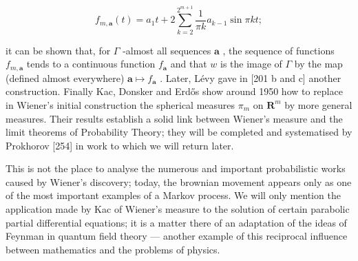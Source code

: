 \[
f _ {m, \mathbf {a}} (t) = a _ {1} t + 2 \sum_ {k = 2} ^ {2 ^ {m + 1}} \frac {1}{\pi k} a _ {k - 1} \sin \pi k t;
\]

it can be shown that, for \(\Gamma\) -almost all sequences \(\mathbf{a}\) , the sequence of functions \(f_{m,\mathbf{a}}\) tends to a continuous function \(f_{\mathbf{a}}\) and that \(w\) is the image of \(\Gamma\) by the map (defined almost everywhere) \(\mathbf{a} \mapsto f_{\mathbf{a}}\) . Later, Lévy gave in {[}201 b and c{]} another construction. Finally Kac, Donsker and Erdős show around 1950 how to replace in Wiener's initial construction the spherical measures \(\pi_m\) on \(\mathbf{R}^m\) by more general measures. Their results establish a solid link between Wiener's measure and the limit theorems of Probability Theory; they will be completed and systematised by Prokhorov {[}254{]} in work to which we will return later.

This is not the place to analyse the numerous and important probabilistic works caused by Wiener's discovery; today, the brownian movement appears only as one of the most important examples of a Markov process. We will only mention the application made by Kac of Wiener's measure to the solution of certain parabolic partial differential equations; it is a matter there of an adaptation of the ideas of Feynman in quantum field theory --- another example of this reciprocal influence between mathematics and the problems of physics.

